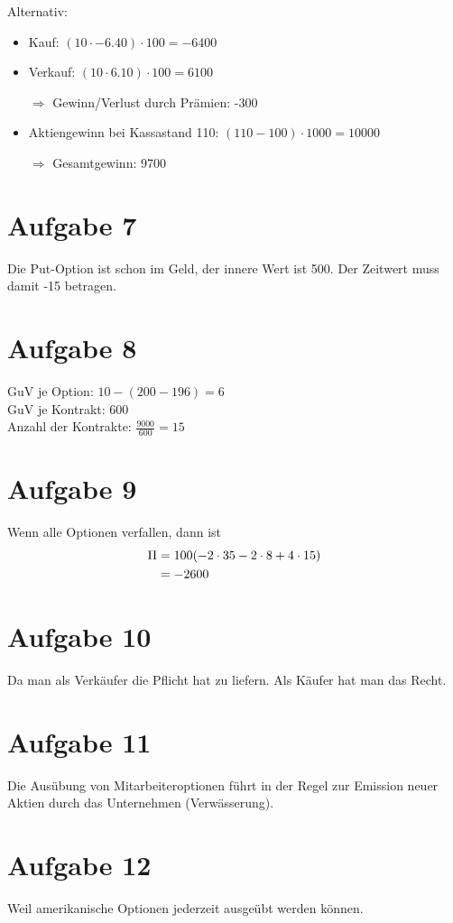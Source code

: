 \documentclass{article}
\begin{document}
	Alternativ:
	\begin{itemize}
		\item Kauf: $(10\cdot -6.40)\cdot 100 = -6400$
		\item Verkauf: $(10\cdot 6.10)\cdot 100 = 6100$
		\item[$\Rightarrow$] Gewinn/Verlust durch Prämien: -300
		\item Aktiengewinn bei Kassastand 110: $(110-100)\cdot 1000 = 10000$
		\item[$\Rightarrow$] Gesamtgewinn: 9700
	\end{itemize}
	
	\section*{Aufgabe 7}
	Die Put-Option ist schon im Geld, der innere Wert ist 500. Der Zeitwert muss damit -15 betragen.
	
	\section*{Aufgabe 8}
	GuV je Option: $10 - (200-196) = 6$ \\
	GuV je Kontrakt: 600 \\
	Anzahl der Kontrakte: $\frac{9000}{600} = 15$
	
	\section*{Aufgabe 9}
	Wenn alle Optionen verfallen, dann ist
	\begin{align}
		\Pi &= 100(- 2\cdot 35 - 2\cdot 8 + 4\cdot 15) \notag \\
		&= -2600 \notag
	\end{align}
	
	\section*{Aufgabe 10}
	Da man als Verkäufer die Pflicht hat zu liefern. Als Käufer hat man das Recht.
	
	\section*{Aufgabe 11}
	Die Ausübung von Mitarbeiteroptionen führt in der Regel zur Emission neuer Aktien durch das Unternehmen (Verwässerung).
	
	\section*{Aufgabe 12}
	Weil amerikanische Optionen jederzeit ausgeübt werden können.
	
\end{document}
